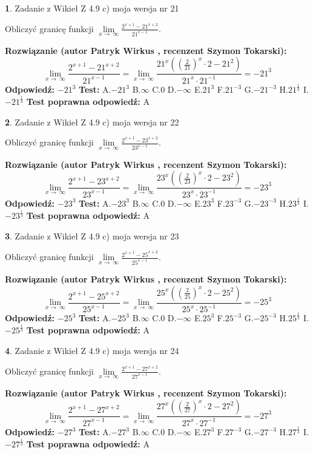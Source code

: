 \documentclass[12pt, a4paper]{article}
\theoremstyle{definition} %
\newtheorem{zad}{}
\newcommand{\zadStart}[1]{\begin{zad}#1\newline}
\newcommand{\zadStop}{\end{zad}}
\newcommand{\rozwStart}[2]{\noindent \textbf{Rozwiązanie (autor #1 , recenzent #2): }\newline}
\newcommand{\rozwStop}{\newline}
\newcommand{\odpStart}{\noindent \textbf{Odpowiedź:}\newline}
\newcommand{\odpStop}{\newline}
\newcommand{\testStart}{\noindent \textbf{Test:}\newline}
\newcommand{\testStop}{\newline}
\newcommand{\kluczStart}{\noindent \textbf{Test poprawna odpowiedź:}\newline}
\newcommand{\kluczStop}{\newline}
\begin{document}
\zadStart{Zadanie z Wikieł Z 4.9 c) moja wersja nr 21}


Obliczyć granicę funkcji  $\lim\limits_{x\to\ \infty}\frac{2^{x+1}-21^{x+2}}{21^{x-1}}$.
\zadStop
\rozwStart{Patryk Wirkus}{Szymon Tokarski}
$$\lim\limits_{x\to\ \infty}\frac{2^{x+1}-21^{x+2}}{21^{x-1}}=\lim\limits_{x\to\ \infty}\frac{21^{x}((\frac{2}{21})^{x}\cdot 2 -21^{2})}{21^{x}\cdot 21^{-1}} = -21^{3}$$
\rozwStop
\odpStart
$-21^{3}$
\odpStop
\testStart
A.$-21^{3}$ B.$\infty$ C.$0$ D.$-\infty$ E.$21^{3}$
F.$21^{-3}$ G.$-21^{-3}$
H.$21^{\frac{1}{3}}$
I.$-21^{\frac{1}{3}}$
\testStop
\kluczStart
A
\kluczStop



\zadStart{Zadanie z Wikieł Z 4.9 c) moja wersja nr 22}


Obliczyć granicę funkcji  $\lim\limits_{x\to\ \infty}\frac{2^{x+1}-23^{x+2}}{23^{x-1}}$.
\zadStop
\rozwStart{Patryk Wirkus}{Szymon Tokarski}
$$\lim\limits_{x\to\ \infty}\frac{2^{x+1}-23^{x+2}}{23^{x-1}}=\lim\limits_{x\to\ \infty}\frac{23^{x}((\frac{2}{23})^{x}\cdot 2 -23^{2})}{23^{x}\cdot 23^{-1}} = -23^{3}$$
\rozwStop
\odpStart
$-23^{3}$
\odpStop
\testStart
A.$-23^{3}$ B.$\infty$ C.$0$ D.$-\infty$ E.$23^{3}$
F.$23^{-3}$ G.$-23^{-3}$
H.$23^{\frac{1}{3}}$
I.$-23^{\frac{1}{3}}$
\testStop
\kluczStart
A
\kluczStop



\zadStart{Zadanie z Wikieł Z 4.9 c) moja wersja nr 23}


Obliczyć granicę funkcji  $\lim\limits_{x\to\ \infty}\frac{2^{x+1}-25^{x+2}}{25^{x-1}}$.
\zadStop
\rozwStart{Patryk Wirkus}{Szymon Tokarski}
$$\lim\limits_{x\to\ \infty}\frac{2^{x+1}-25^{x+2}}{25^{x-1}}=\lim\limits_{x\to\ \infty}\frac{25^{x}((\frac{2}{25})^{x}\cdot 2 -25^{2})}{25^{x}\cdot 25^{-1}} = -25^{3}$$
\rozwStop
\odpStart
$-25^{3}$
\odpStop
\testStart
A.$-25^{3}$ B.$\infty$ C.$0$ D.$-\infty$ E.$25^{3}$
F.$25^{-3}$ G.$-25^{-3}$
H.$25^{\frac{1}{3}}$
I.$-25^{\frac{1}{3}}$
\testStop
\kluczStart
A
\kluczStop



\zadStart{Zadanie z Wikieł Z 4.9 c) moja wersja nr 24}


Obliczyć granicę funkcji  $\lim\limits_{x\to\ \infty}\frac{2^{x+1}-27^{x+2}}{27^{x-1}}$.
\zadStop
\rozwStart{Patryk Wirkus}{Szymon Tokarski}
$$\lim\limits_{x\to\ \infty}\frac{2^{x+1}-27^{x+2}}{27^{x-1}}=\lim\limits_{x\to\ \infty}\frac{27^{x}((\frac{2}{27})^{x}\cdot 2 -27^{2})}{27^{x}\cdot 27^{-1}} = -27^{3}$$
\rozwStop
\odpStart
$-27^{3}$
\odpStop
\testStart
A.$-27^{3}$ B.$\infty$ C.$0$ D.$-\infty$ E.$27^{3}$
F.$27^{-3}$ G.$-27^{-3}$
H.$27^{\frac{1}{3}}$
I.$-27^{\frac{1}{3}}$
\testStop
\kluczStart
A
\kluczStop
\end{document}
